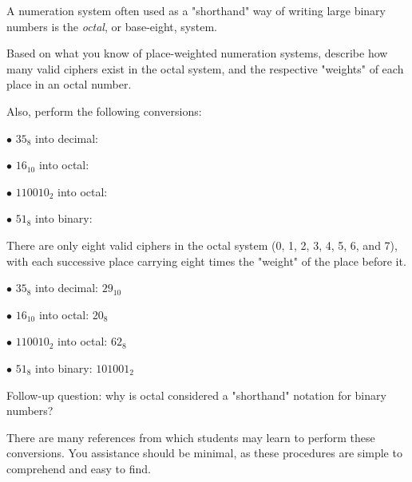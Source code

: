 

A numeration system often used as a "shorthand" way of writing large binary numbers is the {\it octal}, or base-eight, system.

Based on what you know of place-weighted numeration systems, describe how many valid ciphers exist in the octal system, and the respective "weights" of each place in an octal number.

Also, perform the following conversions:

\medskip
\item{$\bullet$} $35_{8}$ into decimal:
\item{$\bullet$} $16_{10}$ into octal:
\item{$\bullet$} $110010_{2}$ into octal:
\item{$\bullet$} $51_{8}$ into binary:
\medskip







There are only eight valid ciphers in the octal system (0, 1, 2, 3, 4, 5, 6, and 7), with each successive place carrying eight times the "weight" of the place before it.

\medskip
\item{$\bullet$} $35_{8}$ into decimal: $29_{10}$
\item{$\bullet$} $16_{10}$ into octal: $20_{8}$
\item{$\bullet$} $110010_{2}$ into octal: $62_{8}$
\item{$\bullet$} $51_{8}$ into binary: $101001_2$
\medskip

\vskip 10pt

Follow-up question: why is octal considered a "shorthand" notation for binary numbers?







There are many references from which students may learn to perform these conversions.  You assistance should be minimal, as these procedures are simple to comprehend and easy to find.




